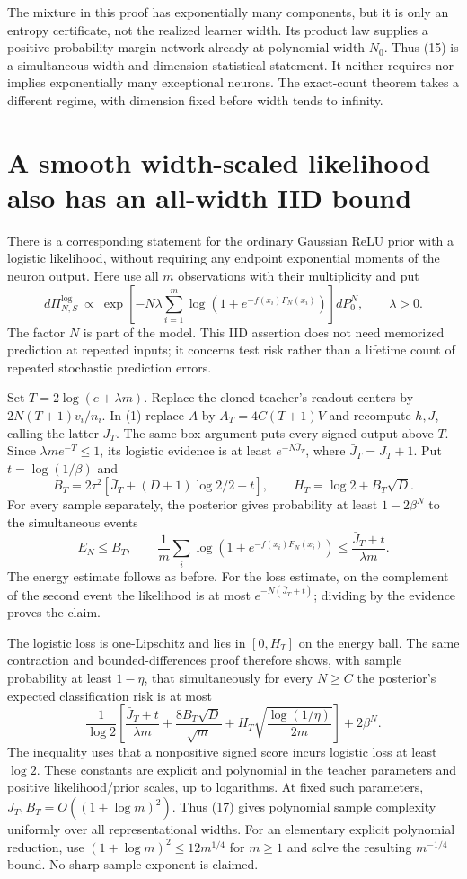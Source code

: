 \documentclass[11pt]{article}
\begin{document}
The mixture in this proof has exponentially many components, but it is
only an entropy certificate, not the realized learner width. Its product
law supplies a positive-probability margin network already at polynomial
width $N_0$. Thus (15) is a simultaneous width-and-dimension statistical
statement. It neither requires nor implies exponentially many exceptional
neurons. The exact-count theorem takes a different regime, with dimension
fixed before width tends to infinity.

\section{A smooth width-scaled likelihood also has an all-width IID bound}
There is a corresponding statement for the ordinary Gaussian ReLU prior
with a logistic likelihood, without requiring any endpoint exponential
moments of the neuron output. Here use all $m$ observations with their
multiplicity and put
\[
 d\Pi_{N,S}^{\log}\ \propto\
 \exp\left[-N\lambda\sum_{i=1}^m
             \log(1+e^{-f(x_i)F_N(x_i)})\right]dP_0^N,
 \qquad\lambda>0.
\]
The factor $N$ is part of the model. This IID assertion does not need
memorized prediction at repeated inputs; it concerns test risk rather
than a lifetime count of repeated stochastic prediction errors.

Set $T=2\log(e+\lambda m)$. Replace the cloned teacher's readout centers
by $2N(T+1)v_i/n_i$. In (1) replace $A$ by $A_T=4C(T+1)V$ and recompute
$h,J$, calling the latter $J_T$. The same box argument puts every signed
output above $T$. Since $\lambda m e^{-T}\le1$, its logistic evidence
is at least $e^{-N\bar J_T}$, where $\bar J_T=J_T+1$.
Put $t=\log(1/\beta)$ and
\[
 B_T=2\tau^2[\bar J_T+(D+1)\log2/2+t],\qquad
 H_T=\log2+B_T\sqrt D.
\]
For every sample separately, the posterior gives probability at least
$1-2\beta^N$ to the simultaneous events
\[
 E_N\le B_T,\qquad
 \frac1m\sum_i\log(1+e^{-f(x_i)F_N(x_i)})
                         \le\frac{\bar J_T+t}{\lambda m}. \tag{16}
\]
The energy estimate follows as before. For the loss estimate, on the
complement of the second event the likelihood is at most
$e^{-N(\bar J_T+t)}$; dividing by the evidence proves the claim.

The logistic loss is one-Lipschitz and lies in $[0,H_T]$ on the energy
ball. The same contraction and bounded-differences proof therefore
shows, with sample probability at least $1-\eta$, that simultaneously
for every $N\ge C$ the posterior's expected classification risk is at most
\[
 \frac1{\log2}\left[
 \frac{\bar J_T+t}{\lambda m}
 +\frac{8B_T\sqrt D}{\sqrt m}
 +H_T\sqrt{\frac{\log(1/\eta)}{2m}}\right]+2\beta^N.       \tag{17}
\]
The inequality uses that a nonpositive signed score incurs logistic loss
at least $\log2$. These constants are explicit and polynomial in the
teacher parameters and positive likelihood/prior scales, up to logarithms.
At fixed such parameters, $J_T,B_T=O((1+\log m)^2)$. Thus (17) gives
polynomial sample complexity uniformly over all representational widths.
For an elementary explicit polynomial reduction, use
$(1+\log m)^2\le12m^{1/4}$ for $m\ge1$ and solve the resulting
$m^{-1/4}$ bound. No sharp sample exponent is claimed.
\end{document}

